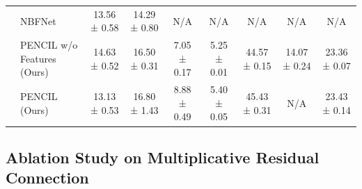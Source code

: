 \documentclass{article}
\theoremstyle{plain}
\theoremstyle{definition}
\theoremstyle{remark}
\begin{document}
\begin{table}[t]
{\begin{tabular}{@{}clccccccc@{}}
             & NBFNet              & 13.56 ± 0.58                        & 14.29 ± 0.80                        & N/A                                & N/A                                & N/A                                 & N/A                                 & N/A                                 \\
             & PENCIL w/o Features (Ours) & 14.63 ± 0.52                        & 16.50 ± 0.31                        & 7.05 ± 0.17                        & 5.25 ± 0.01                        & {\color[HTML]{34A853} 44.57 ± 0.15} & {\color[HTML]{EA4335} 14.07 ± 0.24} & {\color[HTML]{4285F4} 23.36 ± 0.07} \\
             & PENCIL (Ours)              & 13.13 ± 0.53                        & 16.80 ± 1.43                        & {\color{thirdbest}8.88 ± 0.49}                        & 5.40 ± 0.05                        & {\color[HTML]{EA4335} 45.43 ± 0.31} & N/A                                 & {\color[HTML]{34A853} 23.43 ± 0.14} \\ \bottomrule
    \end{tabular}%
    }
\end{table}

\subsection{Ablation Study on Multiplicative Residual Connection} \label{app:mr-ablation-study}

\begin{table}[t]
    \caption{Ablation study on Multiplicative Residual (MR).}
    \label{tab:multplicative-residual}
\end{table}
\end{document}
